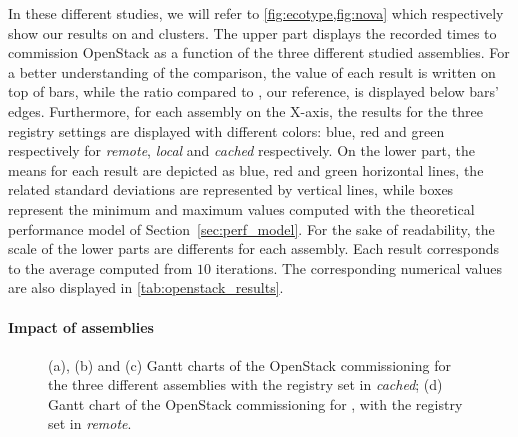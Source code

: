 In these different studies, we will refer to
\cref{fig:ecotype,fig:nova} which respectively show our results on
\ecotype and \nova clusters. The upper part displays the recorded
times to commission OpenStack as a function of the three different
studied assemblies. For a better understanding of the comparison, the
value of each result is written on top of bars, while the ratio
compared to \ansass, our reference, is displayed below bars' edges.
Furthermore, for each assembly on the X-axis, the results for the
three \docker registry settings are displayed with different colors:
blue, red and green respectively for \emph{remote}, \emph{local} and
\emph{cached} respectively. On the lower part, the means for each
result are depicted as blue, red and green horizontal lines, the
related standard deviations are represented by vertical lines, while
boxes represent the minimum and maximum values computed with the
theoretical performance model of Section~\ref{sec:perf_model}.
% 
For the sake of readability, the scale of the lower parts are
differents for each assembly. Each result corresponds to the average
computed from $10$ iterations. The corresponding numerical values are
also displayed in \cref{tab:openstack_results}.
%

\paragraph{Impact of assemblies}

\begin{figure}[t]
  \begin{center}
    \def\svgwidth{\columnwidth}
    \scriptsize
    \def\svgwidth{\columnwidth}
    \scriptsize
    \def\svgwidth{\columnwidth}
    \tiny
    \def\svgwidth{\columnwidth}
    \tiny
    \caption{(a), (b) and (c) Gantt charts of the OpenStack
      commissioning for the three different assemblies with the
      registry set in \emph{cached}; (d) Gantt chart of the OpenStack
      commissioning for \aeoass, with the registry set in
      \emph{remote}.}
  \end{center}
\end{figure}


